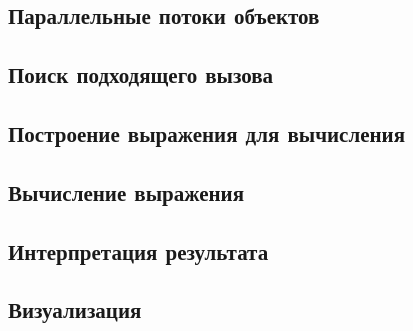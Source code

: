 \subsection{Параллельные потоки объектов}


\subsection{Поиск подходящего вызова}

\subsection{Построение выражения для вычисления}

\subsection{Вычисление выражения}

\subsection{Интерпретация результата}

\subsection{Визуализация}
